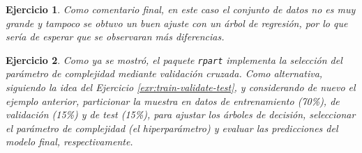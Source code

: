 \documentclass[
]{book}
\theoremstyle{break}
\newtheorem{exercise}{Ejercicio}[chapter]
\theoremstyle{nonumberplain}
\begin{document}
\begin{exercise}
Como comentario final, en este caso el conjunto de datos no es muy grande y tampoco se obtuvo un buen ajuste con un árbol de regresión, por lo que sería de esperar que se observaran más diferencias.
\end{exercise}

\begin{exercise}
\protect\hypertarget{exr:train-validate-test-tree}{}\label{exr:train-validate-test-tree}Como ya se mostró, el paquete \texttt{rpart} implementa la selección del parámetro de complejidad mediante validación cruzada.
Como alternativa, siguiendo la idea del Ejercicio \ref{exr:train-validate-test}, y considerando de nuevo el ejemplo anterior, particionar la muestra en datos de entrenamiento (70\%), de validación (15\%) y de test (15\%), para ajustar los árboles de decisión, seleccionar el parámetro de complejidad (el hiperparámetro) y evaluar las predicciones del modelo final, respectivamente.
\end{exercise}
\end{document}
